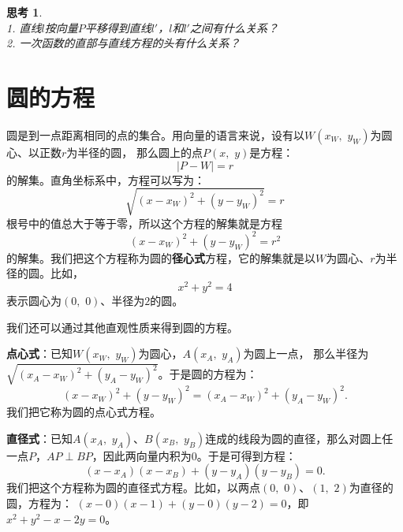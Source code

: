 \documentclass[12pt,UTF8]{ctexbook}
\theoremstyle{definition}
\theoremstyle{plain}
\newtheorem{sk}{思考}[section]
\begin{document}
\begin{sk}
    \mbox{}\\
    1. 直线$l$按向量$P$平移得到直线$l'$，$l$和$l'$之间有什么关系？ \\
    2. 一次函数的直部与直线方程的头有什么关系？
\end{sk}

\section{圆的方程}

圆是到一点距离相同的点的集合。用向量的语言来说，设有以$W(x_W,\,\, y_W)$为圆心、以正数$r$为半径的圆，
那么圆上的点$P(x, \,\,y)$是方程：
$$|P - W| = r$$
的解集。直角坐标系中，方程可以写为：
$$\sqrt{(x - x_W)^2 + (y - y_W)^2} = r$$
根号中的值总大于等于零，所以这个方程的解集就是方程
$$(x - x_W)^2 + (y - y_W)^2 = r^2$$
的解集。我们把这个方程称为圆的\textbf{径心式}方程，它的解集就是以$W$为圆心、$r$为半径的圆。比如，
$$x^2 + y^2 = 4$$
表示圆心为$(0,\,\,0)$、半径为$2$的圆。

我们还可以通过其他直观性质来得到圆的方程。

\textbf{点心式}：已知$W(x_W,\,\, y_W)$为圆心，$A(x_A,\,\,y_A)$为圆上一点，
那么半径为$\sqrt{(x_A - x_W)^2 + (y_A - y_W)^2}$。于是圆的方程为：
$$ (x - x_W)^2 + (y - y_W)^2 = (x_A - x_W)^2 + (y_A - y_W)^2.$$
我们把它称为圆的点心式方程。

\textbf{直径式}：已知$A(x_A,\,\,y_A)$、$B(x_B,\,\,y_B)$连成的线段为圆的直径，那么对圆上任一点$P$，$AP\perp BP$，因此两向量内积为$0$。于是可得到方程：
$$ (x - x_A)(x - x_B) + (y - y_A)(y - y_B) = 0.$$
我们把这个方程称为圆的直径式方程。比如，以两点$(0,\,\,0)$、$(1,\,\,2)$为直径的圆，方程为：
$ (x - 0)(x - 1) + (y - 0)(y - 2) = 0$，即$x^2 + y^2 - x - 2y = 0$。
\end{document}
